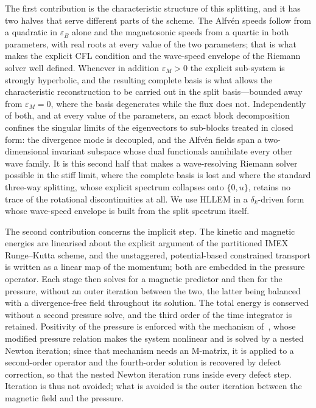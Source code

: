\documentclass[a4paper,fleqn]{cas-sc}
\theoremstyle{remark}
\newcommand{\eps}{\varepsilon}
\newcommand{\epsM}{\eps_{M}}
\newcommand{\epsB}{\eps_{B}}
\begin{document}
The first contribution is the characteristic structure of this splitting, and it
has two halves that serve different parts of the scheme. The Alfv\'en speeds
follow from a quadratic in $\epsB$ alone and the magnetosonic speeds from a
quartic in both parameters, with real roots at every value of the two
parameters; that is what makes the explicit CFL condition and the wave-speed
envelope of the Riemann solver well defined. Whenever in addition $\epsM>0$ the
explicit sub-system is strongly hyperbolic, and the resulting complete basis is
what allows the characteristic reconstruction to be carried out in the split
basis---bounded away from $\epsM=0$, where the basis degenerates while the flux
does not. Independently of both, and at every value of the parameters, an exact block decomposition confines the singular limits of the
eigenvectors to sub-blocks treated in closed form: the divergence mode is
decoupled, and the Alfv\'en fields span a two-dimensional invariant subspace
whose dual functionals annihilate every other wave family. It is this second half
that makes a wave-resolving Riemann solver possible in the stiff limit, where the
complete basis is lost and where the standard three-way splitting, whose explicit
spectrum collapses onto $\{0,u\}$, retains no trace of the rotational
discontinuities at all. We use HLLEM in a $\delta_k$-driven form whose wave-speed
envelope is built from the split spectrum itself.

The second contribution concerns the implicit step. The kinetic and magnetic
energies are linearised about the explicit argument of the partitioned IMEX
Runge--Kutta scheme, and the unstaggered, potential-based constrained transport
is written as a linear map of the momentum; both are embedded in the pressure
operator. Each stage then solves for a magnetic predictor and then for the
pressure, without an outer iteration between the two, the latter being balanced
with a divergence-free field throughout its solution. The total energy is
conserved without a second pressure solve, and the third order of the time
integrator is retained. Positivity of the pressure is enforced with the
mechanism of~\cite{MHDIMEX}, whose modified pressure relation makes the system
nonlinear and is solved by a nested Newton iteration; since that mechanism needs
an M-matrix, it is applied to a second-order operator and the fourth-order
solution is recovered by defect correction, so that the nested Newton iteration
runs inside every defect step. Iteration is thus not avoided; what is avoided
is the outer iteration between the magnetic field and the pressure.
\end{document}
